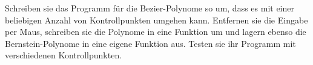\begin{aufg}[0]
Schreiben sie das Programm für die Bezier-Polynome so um, dass es mit einer beliebigen Anzahl von Kontrollpunkten umgehen kann. Entfernen sie 
die Eingabe per Maus, schreiben sie die Polynome in eine Funktion um und lagern ebenso die Bernstein-Polynome in eine eigene Funktion aus.
Testen sie ihr Programm mit verschiedenen Kontrollpunkten.

\end{aufg}
